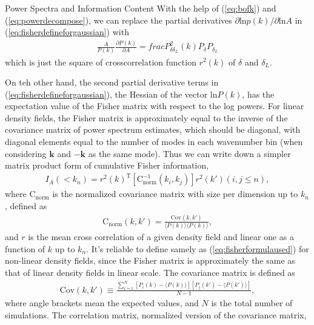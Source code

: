 \begin{section}{Power Spectra and Information Content}
   With the help of (\ref{eq:bofk}) and (\ref{eq:powerdecompose}), we can replace the partial derivatives 
$\partial \mathrm{ln} p(k) / \partial \mathrm{ln} A$ in (\ref{eq:fisherdefineforgaussian}) with 
\begin{align}
   \frac{A}{P(k)}\frac{\partial P(k)}{\partial A}=frac{P_{\delta \delta_L}^2(k)}{P_\delta P_{\delta_L}}
\end{align}
which is just the square of 
crosscorrelation function $r ^2 (k)$ of $\delta$ and $\delta_L$. 

On teh other hand, the second partial derivative terms in 
(\ref{eq:fisherdefineforgaussian}), the Hessian of the vector $\mathrm{ln} P(k)$, has the expectation 
value of the Fisher matrix with respect to the log powers. For linear density fields, the Fisher matrix is 
approximately equal to the inverse of the covariance matrix of power spectrum estimates, which should be diagonal, 
with diagonal elements equal to the number of modes in each wavenumber bin (when considering $\bm{k}$ and $-\bm{k}$ 
as the same mode). Thus we can write down a simpler matrix product form of cumulative Fisher information, 
\begin{align}
    I_A \left( < k_n\right) = r^2(k)^{\mathrm{T}} \left[ \mathrm{C^{-1}_{norm}} ( k_i,k_j )\right] r^2(k')( i,j \leq n ) ,
\label{eq:fisherformulaused}
\end{align}
where $\mathrm{C_{norm}}$ is the normalized covariance matrix with size per dimension up to $k_n$, defined as
\begin{align}
    \mathrm{C_{norm}} \left( k,k' \right)=\frac{\mathrm{Cov}(k,k')}{\langle P(k)\rangle\langle P(k)\rangle},
\end{align}
and $r$ is the mean cross correlation of a given density field and linear one as a function of $k$ up to $k_n$. 
It's reliable to define samely as (\ref{eq:fisherformulaused}) for non-linear density fields, 
since the Fisher matrix is approximately the same as that of linear density fields in linear scale. 
The covariance matrix is defined as 
\begin{align}
    \mathrm{Cov}\left(k,k'\right)\equiv \frac{\sum_{i=1}^{N}\left[ P_i \left( k \right) - 
\langle P \left( k \right) \rangle \right]\left[ P_j \left( k' \right) - \langle P \left( k' \right)\rangle \right]}{N-1},
\end{align}
where angle brackets mean the expected values, and $N$ is the total number of simulations.
    The  correlation matrix, normalized version of the covariance matrix,
\begin{align}

\end{align}
\end{section}
